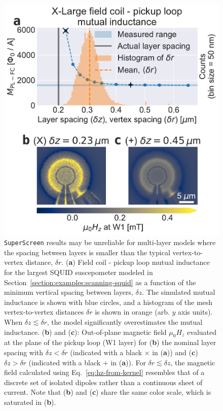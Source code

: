 \documentclass[final,3p,times,twocolumn]{elsarticle}
\newcommand{\inline}[1]{\texttt{#1}\xspace}
\newcommand{\SuperScreen}{\inline{SuperScreen}}
\newcounter{bla}
\begin{document}
\begin{figure}[t]
    \centering
    \includegraphics[width=\linewidth]{examples/images/xlarge-dz-dr.pdf}
    \caption{\SuperScreen results may be unreliable for multi-layer models where the spacing between layers is smaller than the typical vertex-to-vertex distance, $\delta r$. ({\bf a}) Field coil - pickup loop mutual inductance for the largest SQUID suscepometer modeled in Section~\ref{section:examples:scanning-squid} as a function of the minimum vertical spacing between layers, $\delta z$. The simulated mutual inductance is shown with blue circles, and a histogram of the mesh vertex-to-vertex distances $\delta r$ is shown in orange (arb. $y$ axis units). When $\delta z\lesssim\delta r$, the model significantly overestimates the mutual inductance. ({\bf b}) and ({\bf c}): Out-of-plane magnetic field $\mu_0H_z$ evaluated at the plane of the pickup loop (W1 layer) for ({\bf b}) the nominal layer spacing with $\delta z<\delta r$ (indicated with a black $\times$ in ({\bf a})) and ({\bf c}) $\delta z > \delta r$ (indicated with a black $+$ in ({\bf a})). For $\delta r\lesssim\delta z$, the magnetic field calculated using Eq.~\ref{eq:hz-from-kernel} resembles that of a discrete set of isolated dipoles rather than a continuous sheet of current. Note that ({\bf b}) and ({\bf c}) share the same color scale, which is saturated in ({\bf b}).}
    \label{fig:xlarge-dz-dr}
\end{figure}
\end{document}
